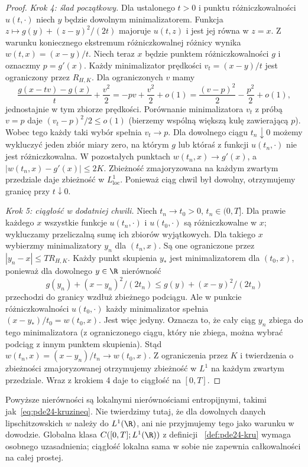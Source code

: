 \begin{proof}
\emph{Krok 4: ślad początkowy.}
Dla ustalonego $t>0$ i punktu różniczkowalności
$u(t,\cdot)$ niech $y$ będzie dowolnym
minimalizatorem. Funkcja
$z\mapsto g(y)+(z-y)^2/(2t)$ majoruje
$u(t,z)$ i jest jej równa w $z=x$.
Z warunku koniecznego ekstremum różniczkowalnej
różnicy wynika $w(t,x)=(x-y)/t$.
Niech teraz $x$ będzie punktem różniczkowalności
$g$ i oznaczmy $p=g'(x)$. Każdy minimalizator
prędkości $v_t=(x-y)/t$ jest ograniczony przez
$R_{H,K}$. Dla ograniczonych $v$ mamy
\[
 \frac{g(x-tv)-g(x)}{t}+\frac{v^2}{2}
 =-pv+\frac{v^2}{2}+o(1)
 =\frac{(v-p)^2}{2}-\frac{p^2}{2}+o(1),
\]
jednostajnie w tym zbiorze prędkości.
Porównanie minimalizatora $v_t$ z próbą $v=p$
daje $(v_t-p)^2/2\le o(1)$ (bierzemy
wspólną większą kulę zawierającą $p$).
Wobec tego każdy taki wybór spełnia $v_t\to p$.
Dla dowolnego ciągu $t_n\downarrow0$ możemy
wykluczyć jeden zbiór miary zero, na którym
$g$ lub któraś z funkcji $u(t_n,\cdot)$
nie jest różniczkowalna.
W pozostałych punktach $w(t_n,x)\to g'(x)$,
a $|w(t_n,x)-g'(x)|\le2K$.
Zbieżność zmajoryzowana na każdym zwartym
przedziale daje zbieżność w $L^1_{\mathrm{loc}}$.
Ponieważ ciąg chwil był dowolny, otrzymujemy
granicę przy $t\downarrow0$.

\emph{Krok 5: ciągłość w dodatniej chwili.}
Niech $t_n\to t_0>0$, $t_n\in(0,T]$.
Dla prawie każdego $x$ wszystkie funkcje
$u(t_n,\cdot)$ i $u(t_0,\cdot)$ są
różniczkowalne w $x$; wykluczamy przeliczalną
sumę ich zbiorów wyjątkowych.
Dla takiego $x$ wybierzmy minimalizatory $y_n$
dla $(t_n,x)$. Są one ograniczone przez
$|y_n-x|\le TR_{H,K}$. Każdy punkt skupienia
$y_*$ jest minimalizatorem dla $(t_0,x)$,
ponieważ dla dowolnego $y\in\R$ nierówność
\[
 g(y_n)+(x-y_n)^2/(2t_n)\le g(y)+(x-y)^2/(2t_n)
\]
przechodzi do granicy wzdłuż zbieżnego podciągu.
Ale w punkcie różniczkowalności $u(t_0,\cdot)$
każdy minimalizator spełnia
$(x-y_*)/t_0=w(t_0,x)$.
Jest więc jedyny. Oznacza to, że cały ciąg
$y_n$ zbiega do tego minimalizatora
(z ograniczonego ciągu, który nie zbiega,
można wybrać podciąg z innym punktem skupienia).
Stąd $w(t_n,x)=(x-y_n)/t_n\to w(t_0,x)$.
Z ograniczenia przez $K$ i twierdzenia
o zbieżności zmajoryzowanej otrzymujemy
zbieżność w $L^1$ na każdym zwartym przedziale.
Wraz z krokiem 4 daje to ciągłość na $[0,T]$.
\end{proof}

\begin{uwaga}
Powyższe nierówności są lokalnymi nierównościami
entropijnymi, takimi jak~\eqref{eq:pde24-kruzineq}.
Nie twierdzimy tutaj, że dla dowolnych danych
lipschitzowskich $w$ należy do $L^1(\R)$,
ani nie przyjmujemy tego jako warunku w dowodzie.
Globalna klasa $C([0,T];L^1(\R))$ z definicji
~\ref{def:pde24-kru} wymaga osobnego uzasadnienia;
ciągłość lokalna sama w sobie nie zapewnia
całkowalności na całej prostej.
\end{uwaga}

